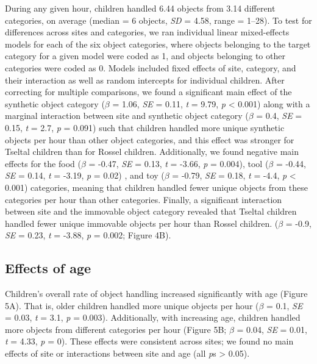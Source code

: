 \documentclass[10pt, letterpaper]{article}
\begin{document}
During any given hour, children handled 6.44 objects from 3.14 different
categories, on average (median = 6 objects, \emph{SD} = 4.58, range =
1--28). To test for differences across sites and categories, we ran
individual linear mixed-effects models for each of the six object
categories, where objects belonging to the target category for a given
model were coded as 1, and objects belonging to other categories were
coded as 0. Models included fixed effects of site, category, and their
interaction as well as random intercepts for individual children. After
correcting for multiple comparisons, we found a significant main effect
of the synthetic object category (\(\beta\) = 1.06, \emph{SE} = 0.11,
\emph{t} = 9.79, \emph{p} \textless{} 0.001) along with a marginal
interaction between site and synthetic object category (\(\beta\) = 0.4,
\emph{SE} = 0.15, \emph{t} = 2.7, \emph{p} = 0.091) such that children
handled more unique synthetic objects per hour than other object
categories, and this effect was stronger for Tseltal children than for
Rossel children. Additionally, we found negative main effects for the
food (\(\beta\) = -0.47, \emph{SE} = 0.13, \emph{t} = -3.66, \emph{p} =
0.004), tool (\(\beta\) = -0.44, \emph{SE} = 0.14, \emph{t} = -3.19,
\emph{p} = 0.02) , and toy (\(\beta\) = -0.79, \emph{SE} = 0.18,
\emph{t} = -4.4, \emph{p} \textless{} 0.001) categories, meaning that
children handled fewer unique objects from these categories per hour
than other categories. Finally, a significant interaction between site
and the immovable object category revealed that Tseltal children handled
fewer unique immovable objects per hour than Rossel children. (\(\beta\)
= -0.9, \emph{SE} = 0.23, \emph{t} = -3.88, \emph{p} = 0.002; Figure
4B).

\hypertarget{effects-of-age}{%
\subsection{Effects of age}\label{effects-of-age}}

Children's overall rate of object handling increased significantly with
age (Figure 5A). That is, older children handled more unique objects per
hour (\(\beta\) = 0.1, \emph{SE} = 0.03, \emph{t} = 3.1, \emph{p} =
0.003). Additionally, with increasing age, children handled more objects
from different categories per hour (Figure 5B; \(\beta\) = 0.04,
\emph{SE} = 0.01, \emph{t} = 4.33, \emph{p} = 0). These effects were
consistent across sites; we found no main effects of site or
interactions between site and age (all \emph{p}s \textgreater{} 0.05).
\end{document}
